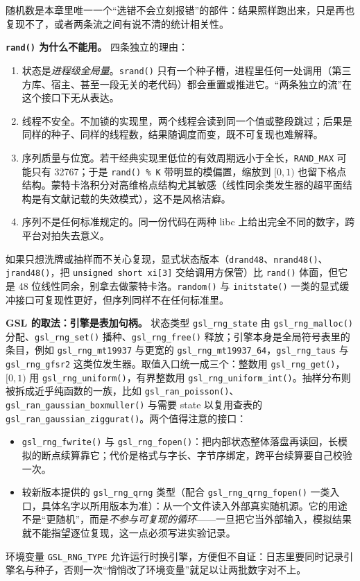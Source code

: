 \documentclass[12pt,a4paper,fontset=fandol]{ctexbook}
\newcommand{\Fn}[1]{\texttt{#1()}}
\newcommand{\Tp}[1]{\texttt{#1}}
\newcommand{\Bk}{\allowbreak}
\newcommand{\Lib}[1]{\textbf{#1}}
\begin{document}
随机数是本章里唯一一个``选错不会立刻报错''的部件：结果照样跑出来，只是再也复现不了，或者两条流之间有说不清的统计相关性。

\textbf{\Tp{rand()} 为什么不能用。} 四条独立的理由：
\begin{enumerate}
\item 状态是\emph{进程级全局量}。\Tp{srand()} 只有一个种子槽，进程里任何一处调用（第三方库、宿主、甚至一段无关的老代码）都会重置或推进它。``两条独立的流''在这个接口下无从表达。
\item 线程不安全。不加锁的实现里，两个线程会读到同一个值或整段跳过；后果是同样的种子、同样的线程数，结果随调度而变，既不可复现也难解释。
\item 序列质量与位宽。若干经典实现里低位的有效周期远小于全长，\Tp{RAND\_MAX} 可能只有 32767；于是 \Tp{rand() \% K} 带明显的模偏置，缩放到 $[0,1)$ 也留下格点结构。蒙特卡洛积分对高维格点结构尤其敏感（线性同余类发生器的超平面结构是有文献记载的失效模式），这不是风格洁癖。
\item 序列不是任何标准规定的。同一份代码在两种 libc 上给出完全不同的数字，跨平台对拍失去意义。
\end{enumerate}
如果只想洗牌或抽样而不关心复现，显式状态版本（\Tp{drand48}、\Fn{nrand48}、\Fn{jrand48}，把 \Tp{unsigned short xi[3]} 交给调用方保管）比 \Tp{rand()} 体面，但它是 48 位线性同余，别拿去做蒙特卡洛。\Fn{random} 与 \Fn{initstate} 一类的显式缓冲接口可复现性更好，但序列同样不在任何标准里。

\textbf{\Lib{GSL} 的取法：引擎是表加句柄。} 状态类型 \Tp{gsl\_rng\_state} 由 \Fn{gsl\_rng\Bk\_malloc} 分配、\Fn{gsl\_rng\_set} 播种、\Fn{gsl\_rng\_free} 释放；引擎本身是全局符号表里的条目，例如 \Tp{gsl\_rng\Bk\_mt19937} 与更宽的 \Tp{gsl\_rng\Bk\_mt19937\_64}，\Tp{gsl\_rng\_taus} 与 \Tp{gsl\_rng\_gfsr2} 这类位发生器。取值入口统一成三个：整数用 \Fn{gsl\_rng\_get}，$[0,1)$ 用 \Fn{gsl\_rng\Bk\_uniform}，有界整数用 \Fn{gsl\_rng\Bk\_uniform\Bk\_int}。抽样分布则被拆成近乎纯函数的一族，比如 \Fn{gsl\_ran\Bk\_poisson}、\Fn{gsl\_ran\Bk\_gaussian\Bk\_boxmuller} 与需要 state 以复用查表的 \Fn{gsl\_ran\Bk\_gaussian\Bk\_ziggurat}。两个值得注意的接口：
\begin{itemize}
\item \Fn{gsl\_rng\_fwrite} 与 \Fn{gsl\_rng\_fopen}：把内部状态整体落盘再读回，长模拟的断点续算靠它；代价是格式与字长、字节序绑定，跨平台续算要自己校验一次。
\item 较新版本提供的 \Tp{gsl\_rng\_qrng} 类型（配合 \Fn{gsl\_rng\Bk\_qrng\Bk\_fopen} 一类入口，具体名字以所用版本为准）：从一个文件读入外部真实随机源。它的用途不是``更随机''，而是\emph{不参与可复现的循环}——一旦把它当外部输入，模拟结果就不能指望逐位复现，这一点必须写进实验记录。
\end{itemize}
环境变量 \Tp{GSL\_RNG\_TYPE} 允许运行时换引擎，方便但不自证：日志里要同时记录引擎名与种子，否则一次``悄悄改了环境变量''就足以让两批数字对不上。
\end{document}
